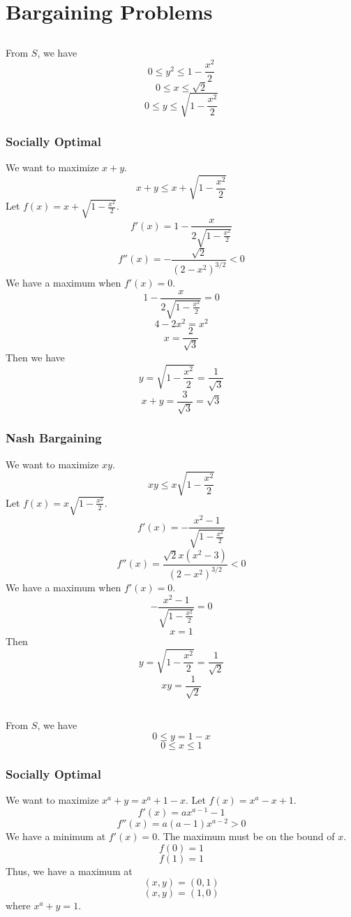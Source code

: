 




\section{Bargaining Problems}

\subsection{}
From $S$, we have
\[0 \leq y^2 \leq 1-\frac{x^2}{2}\]
\[0 \leq x \leq \sqrt{2}\]
\[0 \leq y \leq \sqrt{1-\frac{x^2}{2}}\]
\subsubsection{Socially Optimal}
We want to maximize $x+y$.
\[x + y \leq x + \sqrt{1-\frac{x^2}{2}}\]
Let $f(x)=x + \sqrt{1-\frac{x^2}{2}}$.
\[f'(x)=1-\frac{x}{2\sqrt{1-\frac{x^2}{2}}}\]
\[f''(x)=-\frac{\sqrt{2}}{(2-x^2)^{3/2}}<0\]
We have a maximum when $f'(x)=0$.
\[1-\frac{x}{2\sqrt{1-\frac{x^2}{2}}}=0\]
\[4-2x^2=x^2\]
\[x=\frac{2}{\sqrt{3}}\]
Then we have
\[y=\sqrt{1-\frac{x^2}{2}}=\frac{1}{\sqrt{3}}\]
\[x+y=\frac{3}{\sqrt{3}}=\sqrt{3}\]

\subsubsection{Nash Bargaining}
We want to maximize $xy$.
\[xy \leq x\sqrt{1-\frac{x^2}{2}}\]
Let $f(x)=x \sqrt{1-\frac{x^2}{2}}$.
\[f'(x)=-\frac{x^2-1}{\sqrt{1-\frac{x^2}{2}}}\]
\[f''(x)=\frac{\sqrt{2}x(x^2-3)}{(2-x^2)^{3/2}}<0\]
We have a maximum when $f'(x)=0$.
\[-\frac{x^2-1}{\sqrt{1-\frac{x^2}{2}}}=0\]
\[x=1\]
Then
\[y=\sqrt{1-\frac{x^2}{2}}=\frac{1}{\sqrt{2}}\]
\[xy=\frac{1}{\sqrt{2}}\]

\subsection{}
From $S$, we have
\[0\leq y=1-x\]
\[0\leq x\leq 1\]

\subsubsection{Socially Optimal}
We want to maximize $x^a+y=x^a+1-x$.
Let $f(x)=x^a-x+1$.
\[f'(x)=ax^{a-1}-1\]
\[f''(x)=a(a-1)x^{a-2}>0\]
We have a minimum at $f'(x)=0$. The maximum must be on the bound of $x$.
\[f(0)=1\]
\[f(1)=1\]
Thus, we have a maximum at 
\[(x,y)=(0,1)\]
\[(x,y)=(1,0)\]
where $x^a+y=1$.

